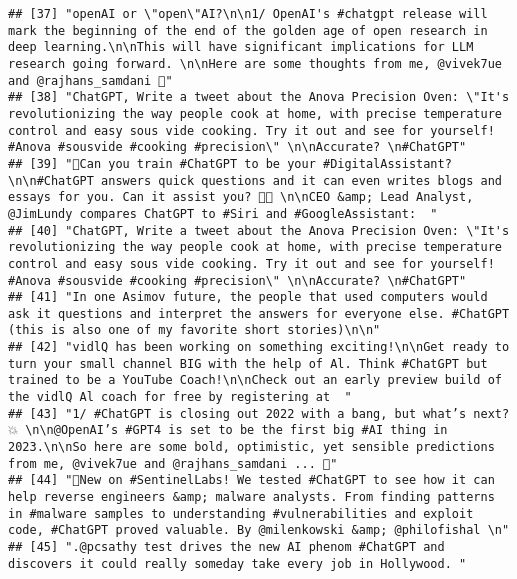 \documentclass[
]{article}
\begin{document}
\begin{verbatim}
## [37] "openAI or \"open\"AI?\n\n1/ OpenAI's #chatgpt release will mark the beginning of the end of the golden age of open research in deep learning.\n\nThis will have significant implications for LLM research going forward. \n\nHere are some thoughts from me, @vivek7ue and @rajhans_samdani 🧵"                
## [38] "ChatGPT, Write a tweet about the Anova Precision Oven: \"It's revolutionizing the way people cook at home, with precise temperature control and easy sous vide cooking. Try it out and see for yourself! #Anova #sousvide #cooking #precision\" \n\nAccurate? \n#ChatGPT"                                      
## [39] "📱Can you train #ChatGPT to be your #DigitalAssistant? \n\n#ChatGPT answers quick questions and it can even writes blogs and essays for you. Can it assist you? 👩‍💻 \n\nCEO &amp; Lead Analyst, @JimLundy compares ChatGPT to #Siri and #GoogleAssistant:  "                                                  
## [40] "ChatGPT, Write a tweet about the Anova Precision Oven: \"It's revolutionizing the way people cook at home, with precise temperature control and easy sous vide cooking. Try it out and see for yourself! #Anova #sousvide #cooking #precision\" \n\nAccurate? \n#ChatGPT"                                      
## [41] "In one Asimov future, the people that used computers would ask it questions and interpret the answers for everyone else. #ChatGPT (this is also one of my favorite short stories)\n\n"                                                                                                                         
## [42] "vidlQ has been working on something exciting!\n\nGet ready to turn your small channel BIG with the help of Al. Think #ChatGPT but trained to be a YouTube Coach!\n\nCheck out an early preview build of the vidlQ Al coach for free by registering at  "                                                       
## [43] "1/ #ChatGPT is closing out 2022 with a bang, but what’s next? 💥 \n\n@OpenAI’s #GPT4 is set to be the first big #AI thing in 2023.\n\nSo here are some bold, optimistic, yet sensible predictions from me, @vivek7ue and @rajhans_samdani ... 👀"                                                              
## [44] "🤖New on #SentinelLabs! We tested #ChatGPT to see how it can help reverse engineers &amp; malware analysts. From finding patterns in #malware samples to understanding #vulnerabilities and exploit code, #ChatGPT proved valuable. By @milenkowski &amp; @philofishal \n"                                     
## [45] ".@pcsathy test drives the new AI phenom #ChatGPT and discovers it could really someday take every job in Hollywood. "                                                                                                                                                                                          

\end{verbatim}
\end{document}
